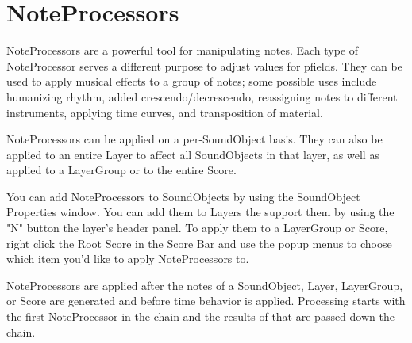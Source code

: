 \section{NoteProcessors}\label{conceptsNoteProcessors}

NoteProcessors are a powerful tool for manipulating notes. Each type of
NoteProcessor serves a different purpose to adjust values for pfields.
They can be used to apply musical effects to a group of notes; some
possible uses include humanizing rhythm, added crescendo/decrescendo,
reassigning notes to different instruments, applying time curves, and
transposition of material.

NoteProcessors can be applied on a per-SoundObject basis. They can also
be applied to an entire Layer to affect all SoundObjects in that layer,
as well as applied to a LayerGroup or to the entire Score.

You can add NoteProcessors to SoundObjects by using the SoundObject
Properties window. You can add them to Layers the support them by using
the "N" button the layer's header panel. To apply them to a LayerGroup
or Score, right click the Root Score in the Score Bar and use the popup
menus to choose which item you'd like to apply NoteProcessors to.

NoteProcessors are applied after the notes of a SoundObject, Layer,
LayerGroup, or Score are generated and before time behavior is applied.
Processing starts with the first NoteProcessor in the chain and the
results of that are passed down the chain.
